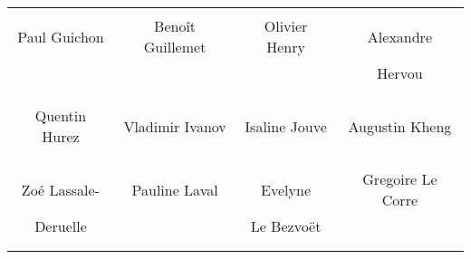 \begin{center}
\begin{tabular}{cccc}
&&& \\
Paul Guichon & Benoît Guillemet & Olivier Henry & Alexandre\\ & & & Hervou \\ \\ \\

&&& \\
Quentin Hurez & Vladimir Ivanov & Isaline Jouve & Augustin Kheng \\ \\ \\

&&& \\
Zoé Lassale- & Pauline Laval & Evelyne & Gregoire Le Corre \\ Deruelle & & Le Bezvoët & \\ \\ \\

\end{tabular}
\end{center}
	
\vfill
\pagebreak

